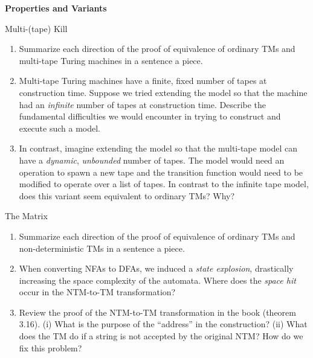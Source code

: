 \documentclass[11pt]{book}
\newcommand{\doctitle}{Properties and Variants}
\begin{document}
\begin{center}
  \large\textbf{{\doctitle}}
\end{center}

\vspace{2em}


\begin{problem}{Multi-(tape) Kill}
\begin{enumerate}[label=(\alph*)]
  \item Summarize each direction of the proof of equivalence of ordinary TMs and multi-tape Turing machines in a sentence a piece.
  \item Multi-tape Turing machines have a finite, fixed number of tapes at construction time.
    Suppose we tried extending the model so that the machine had an \emph{infinite} number of tapes at construction time.
    Describe the fundamental difficulties we would encounter in trying to construct and execute such a model.
  \item In contrast, imagine extending the model so that the multi-tape model can have a \emph{dynamic}, \emph{unbounded} number of tapes.
    The model would need an operation to spawn a new tape and the transition function would need to be modified to operate over a list of tapes.
    In contrast to the infinite tape model, does this variant seem equivalent to ordinary TMs?
    Why?
\end{enumerate}
\end{problem}

\vspace{1.5in}

\begin{problem}{The Matrix}
\begin{enumerate}[label=(\alph*)]
  \item Summarize each direction of the proof of equivalence of ordinary TMs and non-deterministic TMs in a sentence a piece.
  \item When converting NFAs to DFAs, we induced a \emph{state explosion}, drastically increasing the space complexity of the automata.
    Where does the \emph{space hit} occur in the NTM-to-TM transformation?
  \item Review the proof of the NTM-to-TM transformation in the book (theorem 3.16).
    (i) What is the purpose of the ``address'' in the construction?
    (ii) What does the TM do if a string is not accepted by the original NTM?
    How do we fix this problem?
\end{enumerate}
\end{problem}
\end{document}
